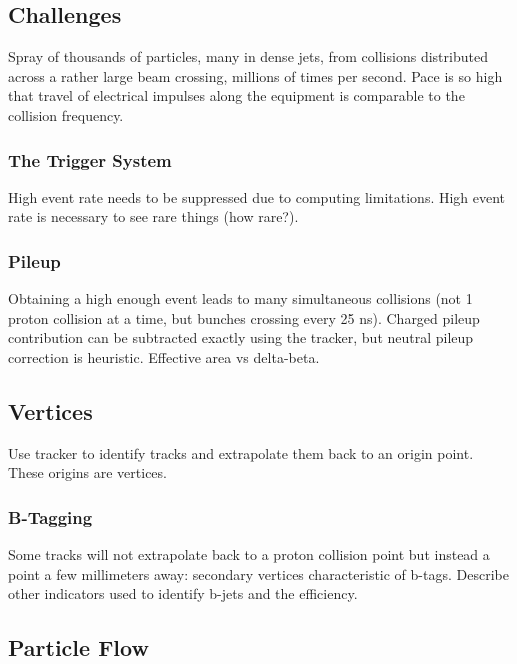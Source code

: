   \subsection{Challenges} \label{sec:challenges}

  Spray of thousands of particles, many in dense jets, from collisions distributed across a rather large beam crossing, millions of times per second.
  Pace is so high that travel of electrical impulses along the equipment is comparable to the collision frequency.

    \subsubsection{The Trigger System} \label{sec:trigger}

    High event rate needs to be suppressed due to computing limitations.
    High event rate is necessary to see rare things (how rare?).

    \subsubsection{Pileup} \label{sec:pileup}

    Obtaining a high enough event leads to many simultaneous collisions (not 1 proton collision at a time, but bunches crossing every 25 ns).
    Charged pileup contribution can be subtracted exactly using the tracker, but neutral pileup correction is heuristic.
    Effective area vs delta-beta.

  \subsection{Vertices} \label{sec:vertices}

  Use tracker to identify tracks and extrapolate them back to an origin point.
  These origins are vertices.

    \subsubsection{B-Tagging} \label{sec:btagging}

    Some tracks will not extrapolate back to a proton collision point but instead a point a few millimeters away: secondary vertices characteristic of b-tags.
    Describe other indicators used to identify b-jets and the efficiency.

  \subsection{Particle Flow} \label{sec:particleflow}

